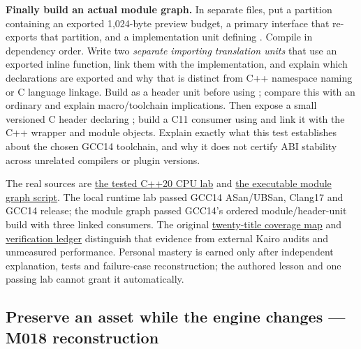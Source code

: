 \textbf{Finally build an actual module graph.} In separate files, put a  partition containing an exported 1,024-byte preview budget, a primary  interface that re-exports that partition, and a  implementation unit defining . Compile in dependency order. Write two \emph{separate importing translation units} that use an exported inline function, link them with the implementation, and explain which declarations are exported and why that is distinct from C++ namespace naming or C language linkage. Build  as a header unit before using ; compare this with an ordinary  and explain macro/toolchain implications. Then expose a small versioned C header declaring ; build a C11 consumer using  and link it with the C++ wrapper and module objects. Explain exactly what this test establishes about the chosen GCC14 toolchain, and why it does not certify ABI stability across unrelated compilers or plugin versions.

The real sources are \hyperref[source-file-a1c76c44bc377537c732f5c4]{the tested C++20 CPU lab} and \hyperref[source-file-e1b7c3e4f52da0e7c9c36a41]{the executable module graph script}. The local runtime lab passed GCC14 ASan/UBSan, Clang17 and GCC14 release; the module graph passed GCC14's ordered module/header-unit build with three linked consumers. The original \hyperref[appendix-fd090d982a15-m017-parts-271290-lazy-asset-queries-allocation-lifetimes-and-compiled-api-boundaries]{twenty-title coverage map} and \hyperref[appendix-a103e7846d21-phase-7-additive-reconstruction-m017-parts-271290]{verification ledger} distinguish that evidence from external Kairo audits and unmeasured performance. Personal mastery is earned only after independent explanation, tests and failure-case reconstruction; the authored lesson and one passing lab cannot grant it automatically.

\subsection{Preserve an asset while the engine changes --- M018 reconstruction}\label{appendix-960160274237-preserve-an-asset-while-the-engine-changes-m018-reconstruction}

\hypertarget{appendix-960160274237-preserve-an-asset-while-the-engine-changes-m018-reconstruction}{}

